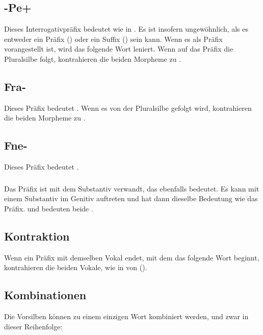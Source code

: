 \subsection{-Pe+} \label{morph:pre:pe} Dieses Interrogativpräfix bedeutet  wie in  . Es ist insofern ungewöhnlich, als es entweder ein Präfix () oder ein Suffix () sein kann. Wenn es als Präfix vorangestellt ist, wird das folgende Wort leniert. Wenn auf das Präfix die Pluralsilbe  folgt, kontrahieren die beiden Morpheme zu .

\subsection{Fra-} Dieses Präfix bedeutet . Wenn es von der Pluralsilbe  gefolgt wird, kontrahieren die beiden Morpheme zu .
 

\subsection{Fne-} Dieses Präfix bedeutet .

\subsubsection{} Das Präfix ist mit dem Substantiv  verwandt, das ebenfalls  bedeutet. Es kann mit einem Substantiv im Genitiv auftreten und hat dann dieselbe Bedeutung wie das Präfix.  und  bedeuten beide .

\subsection{Kontraktion} Wenn ein Präfix mit demselben Vokal endet, mit dem das folgende Wort beginnt, kontrahieren die beiden Vokale, wie in   von  ().
\label{morph:prenoun:contraction}

\subsection{Kombinationen} Die Vorsilben können zu einem einzigen Wort kombiniert werden, und zwar in dieser Reihenfolge: 


